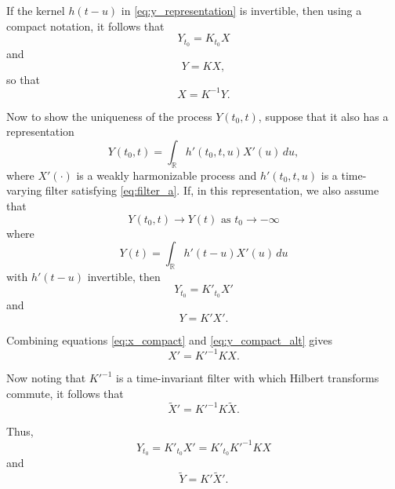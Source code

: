 \documentclass[12pt]{article}
\begin{document}
If the kernel $h(t - u)$ in \eqref{eq:y_representation} is invertible, then using a compact notation, it follows that
\begin{equation}
    Y_{t_0} = K_{t_0} X
    \label{eq:y_t0_compact}
\end{equation}
and
\begin{equation}
    Y = KX,
    \label{eq:y_compact}
\end{equation}
so that
\begin{equation}
    X = K^{-1}Y.
    \label{eq:x_compact}
\end{equation}

Now to show the uniqueness of the process $Y(t_0, t)$, suppose that it also has a representation
\begin{equation}
    Y(t_0, t) = \int_{\mathbb{R}} h'(t_0, t, u) X'(u) \, du,
    \label{eq:y_t0_alt}
\end{equation}
where $X'(\cdot)$ is a weakly harmonizable process and $h'(t_0, t, u)$ is a time-varying filter satisfying \eqref{eq:filter_a}. If, in this representation, we also assume that
\begin{equation}
    Y(t_0, t) \to Y(t) \text{ as } t_0 \to -\infty
    \label{eq:y_limit_alt}
\end{equation}
where
\begin{equation}
    Y(t) = \int_{\mathbb{R}} h'(t - u) X'(u) \, du
    \label{eq:y_alt}
\end{equation}
with $h'(t - u)$ invertible, then
\begin{equation}
    Y_{t_0} = K'_{t_0} X'
    \label{eq:y_t0_compact_alt}
\end{equation}
and
\begin{equation}
    Y = K'X'.
    \label{eq:y_compact_alt}
\end{equation}

Combining equations \eqref{eq:x_compact} and \eqref{eq:y_compact_alt} gives
\begin{equation}
    X' = K'^{-1}KX.
    \label{eq:x_prime}
\end{equation}

Now noting that $K'^{-1}$ is a time-invariant filter with which Hilbert transforms commute, it follows that
\begin{equation}
    \tilde{X}' = K'^{-1}K\tilde{X}.
    \label{eq:x_prime_tilde}
\end{equation}

Thus,
\begin{equation}
    Y_{t_0} = K'_{t_0} X'
    = K'_{t_0} K'^{-1}KX
    \label{eq:y_t0_expanded}
\end{equation}
and
\begin{equation}
    \tilde{Y} = K'\tilde{X}'.
    \label{eq:y_tilde_compact}
\end{equation}
\end{document}
